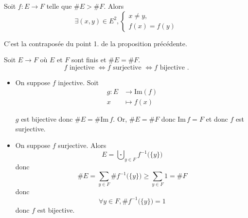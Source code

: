 \begin{prop}
	Soit $f: E \to F$ telle que $\#E > \#F$. Alors \[
		\exists (x,y) \in E^2, \begin{cases}
			x \neq y,\\
			f(x) = f(y)
		\end{cases}
	\]
\end{prop}

\begin{prv}
	C'est la contraposée du point 1. de la proposition précédente.
\end{prv}

\begin{prop}
	Soit $E \to F$ où $E$ et $F$ sont finis et $\#E = \#F$.\[
		f \text{ injective } \iff f \text{ surjective } \iff f \text{ bijective }.
	\]
\end{prop}

\begin{prv}
	\begin{itemize}
		\item On suppose $f$ injective. Soit \begin{align*}
				g: E &\longrightarrow \mathrm{Im}(f) \\
				x &\longmapsto f(x)
			\end{align*}

			$g$ est bijective donc $\#E=\#\mathrm{Im}\,f$. Or, $\#E = \#F$ donc $\mathrm{Im}\,f = F$ et donc $f$ est surjective.
		\item On suppose $f$ surjective. Alors \[
			E = \bigcupdot_{y \in F} f^{-1}\big(\{y\}\big)
		\] donc \[
			\#E = \sum_{y \in F} \#f^{-1}\big(\{y\}\big) \ge \sum_{y\in F}1 = \#F
		\] donc \[
			\forall y \in F, \#f^{-1}\big(\{y\}\big) = 1
		\] donc $f$ est bijective.
	\end{itemize}
\end{prv}




